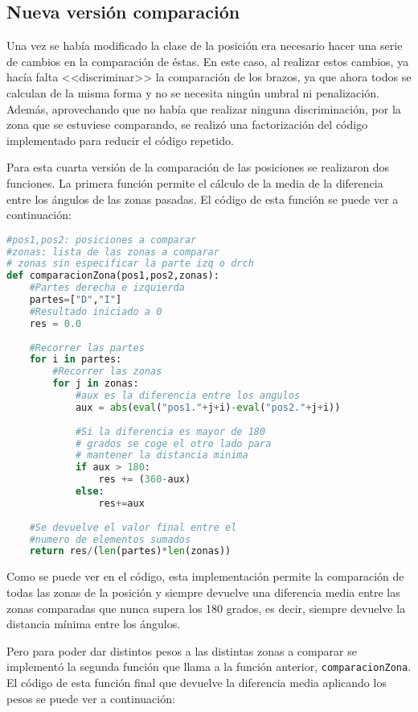 \subsection{Nueva versión comparación}
Una vez se había modificado la clase de la posición era necesario hacer una serie de cambios en la comparación de éstas. En este caso, al realizar estos cambios, ya hacía falta <<discriminar>> la comparación de los brazos, ya que ahora todos se calculan de la misma forma y no se necesita ningún umbral ni penalización. Además, aprovechando que no había que realizar ninguna discriminación, por la zona que se estuviese comparando, se realizó una factorización del código implementado para reducir el código repetido.

Para esta cuarta versión de la comparación de las posiciones se realizaron dos funciones. La primera función permite el cálculo de la media de la diferencia entre los ángulos de las zonas pasadas. El código de esta función se puede ver a continuación:

\begin{lstlisting}[language=Python]
#pos1,pos2: posiciones a comparar
#zonas: lista de las zonas a comparar
# zonas sin especificar la parte izq o drch
def comparacionZona(pos1,pos2,zonas):
	#Partes derecha e izquierda
	partes=["D","I"]
	#Resultado iniciado a 0
	res = 0.0
	
	#Recorrer las partes
	for i in partes:
		#Recorrer las zonas
		for j in zonas:
			#aux es la diferencia entre los angulos
			aux = abs(eval("pos1."+j+i)-eval("pos2."+j+i))
	
			#Si la diferencia es mayor de 180
			# grados se coge el otro lado para
			# mantener la distancia minima
			if aux > 180:
				res += (360-aux)
			else:
				res+=aux
	
	#Se devuelve el valor final entre el
	#numero de elementos sumados
	return res/(len(partes)*len(zonas))
\end{lstlisting}

Como se puede ver en el código, esta implementación permite la comparación de todas las zonas de la posición y siempre devuelve una diferencia media entre las zonas comparadas que nunca supera los 180 grados, es decir, siempre devuelve la distancia mínima entre los ángulos.

Pero para poder dar distintos pesos a las distintas zonas a comparar se implementó la segunda función que llama a la función anterior, \texttt{comparacionZona}. El código de esta función final que devuelve la diferencia media aplicando los pesos se puede ver a continuación:

